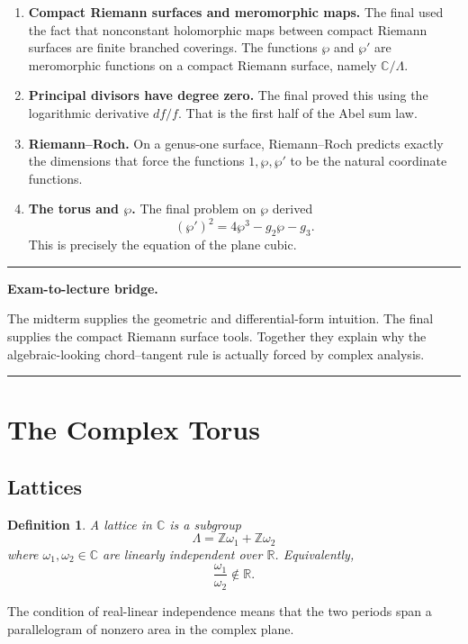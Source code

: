 \documentclass[11pt]{article}
\newcommand{\C}{\mathbb{C}}
\newcommand{\R}{\mathbb{R}}
\newcommand{\Z}{\mathbb{Z}}
\newtheorem*{definition}{Definition}
\newenvironment{keyidea}[1]{%
  \par\medskip
  \begin{center}
  \begin{minipage}{0.92\textwidth}
  \hrule
  \smallskip
  \textbf{#1.}\quad\ignorespaces
}{%
  \smallskip
  \hrule
  \end{minipage}
  \end{center}
  \medskip
}
\begin{document}
\begin{enumerate}
\item \textbf{Compact Riemann surfaces and meromorphic maps.}
The final used the fact that nonconstant holomorphic maps between compact
Riemann surfaces are finite branched coverings.  The functions \(\wp\) and
\(\wp'\) are meromorphic functions on a compact Riemann surface, namely
\(\C/\Lambda\).

\item \textbf{Principal divisors have degree zero.}
The final proved this using the logarithmic derivative \(df/f\).  That is
the first half of the Abel sum law.

\item \textbf{Riemann--Roch.}
On a genus-one surface, Riemann--Roch predicts exactly the dimensions that
force the functions \(1,\wp,\wp'\) to be the natural coordinate functions.

\item \textbf{The torus and \(\wp\).}
The final problem on \(\wp\) derived
\[
(\wp')^2=4\wp^3-g_2\wp-g_3.
\]
This is precisely the equation of the plane cubic.
\end{enumerate}

\begin{keyidea}{Exam-to-lecture bridge}
The midterm supplies the geometric and differential-form intuition.
The final supplies the compact Riemann surface tools.  Together they explain
why the algebraic-looking chord--tangent rule is actually forced by complex
analysis.
\end{keyidea}

\section{The Complex Torus}

\subsection{Lattices}

\begin{definition}
A \emph{lattice} in \(\C\) is a subgroup
\[
\Lambda=\Z\omega_1+\Z\omega_2
\]
where \(\omega_1,\omega_2\in\C\) are linearly independent over \(\R\).
Equivalently,
\[
\frac{\omega_1}{\omega_2}\notin\R.
\]
\end{definition}

The condition of real-linear independence means that the two periods span a
parallelogram of nonzero area in the complex plane.
\end{document}
